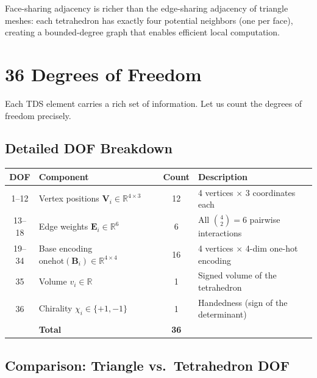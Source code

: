 Face-sharing adjacency is richer than the edge-sharing adjacency of triangle
meshes: each tetrahedron has exactly four potential neighbors (one per face),
creating a bounded-degree graph that enables efficient local computation.

\section{36 Degrees of Freedom}
\label{sec:36-dof}

Each TDS element carries a rich set of information. Let us count the degrees
of freedom precisely.

\subsection{Detailed DOF Breakdown}

\begin{center}
\renewcommand{\arraystretch}{1.25}
\begin{tabular}{clcl}
\toprule
\textbf{DOF} & \textbf{Component} & \textbf{Count} & \textbf{Description} \\
\midrule
1--12 & Vertex positions $\mathbf{V}_i \in \mathbb{R}^{4 \times 3}$ & 12
  & 4 vertices $\times$ 3 coordinates each \\
13--18 & Edge weights $\mathbf{E}_i \in \mathbb{R}^6$ & 6
  & All $\binom{4}{2} = 6$ pairwise interactions \\
19--34 & Base encoding $\text{onehot}(\mathbf{B}_i) \in \mathbb{R}^{4 \times 4}$ & 16
  & 4 vertices $\times$ 4-dim one-hot encoding \\
35 & Volume $v_i \in \mathbb{R}$ & 1
  & Signed volume of the tetrahedron \\
36 & Chirality $\chi_i \in \{+1,-1\}$ & 1
  & Handedness (sign of the determinant) \\
\midrule
& \textbf{Total} & \textbf{36} & \\
\bottomrule
\end{tabular}
\end{center}

\subsection{Comparison: Triangle vs.\ Tetrahedron DOF}

